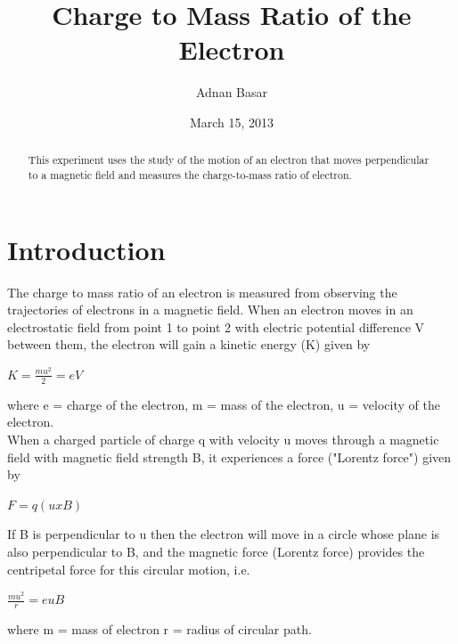 \documentclass[aps,nofootinbib,onecolumn,groupedaddress,a4paper]{revtex4}
\begin{document}
\title{Charge to Mass Ratio of the Electron} 

\author{Adnan Basar}


\date{March 15, 2013}

\begin{abstract}
This experiment uses the study of the motion of an electron that moves perpendicular to a magnetic field and measures the charge-to-mass ratio of electron.
\end{abstract}

\maketitle


\section{Introduction}


The charge to mass ratio of an electron is measured from observing the trajectories of electrons in a magnetic field. When  an electron moves in an electrostatic field from point 1 to point 2 with electric potential  difference V between them,  the electron will gain a kinetic energy (K) given by
\begin{center}
$K=\frac{mu^{2}}{2}=eV $
\end{center}
where	 e = charge  of the electron, m = mass of the electron, u = velocity of the electron. \\



When a charged particle of charge q with velocity u moves through a magnetic field  with magnetic field strength B,  it experiences a force ("Lorentz force") given by
\begin{center}
	$F = q(u x B)$
\end{center}

                                  

If B is perpendicular to u then the electron will move in a circle whose plane is also perpendicular to B, and the  magnetic force (Lorentz force) provides  the centripetal force for this circular motion, i.e.
\begin{center}
$\frac{mu^{2}}{r} = euB$
\end{center}
                             

where	 m = mass of electron
 r = radius of circular path.\\
\end{document}
